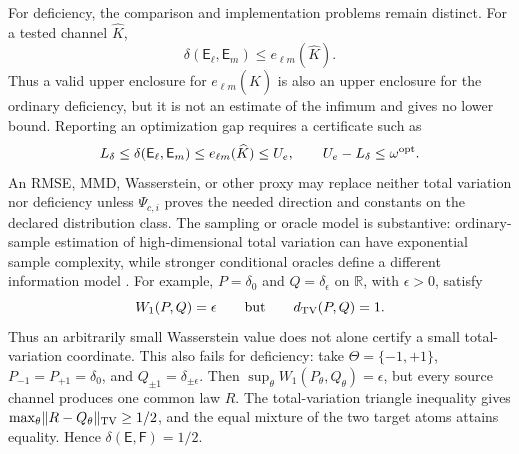 \documentclass[11pt,a4paper]{article}
\theoremstyle{definition}
\theoremstyle{plain}
\theoremstyle{remark}
\begin{document}
For deficiency, the comparison and implementation problems remain distinct.
For a tested channel \(\widehat K\),
\[
\delta(\mathsf E_\ell,\mathsf E_m)
\le e_{\ell m}(\widehat K).
\]
Thus a valid upper enclosure for \(e_{\ell m}(\widehat K)\) is also an upper
enclosure for the ordinary deficiency, but it is not an estimate of the
infimum and gives no lower bound.  Reporting an optimization gap requires a
certificate such as
\[
L_\delta\le\delta(\mathsf E_\ell,\mathsf E_m)
\le e_{\ell m}(\widehat K)\le U_e,
\qquad U_e-L_\delta\le\omega^{\rm opt}.
\]
An RMSE, MMD, Wasserstein, or other proxy may replace neither total variation
nor deficiency unless \(\Psi_{c,i}\) proves the needed direction and constants
on the declared distribution class.  The sampling or oracle model is
substantive: ordinary-sample estimation of high-dimensional total variation
can have exponential sample complexity, while stronger conditional oracles
define a different information model \citep{meel2025}.
For example, \(P=\delta_0\) and \(Q=\delta_\epsilon\) on
\(\mathbb R\), with \(\epsilon>0\), satisfy
\[
W_1(P,Q)=\epsilon
\qquad\text{but}\qquad
d_{\rm TV}(P,Q)=1.
\]
Thus an arbitrarily small Wasserstein value does not alone certify a small
total-variation coordinate.  This also fails for deficiency: take
\(\Theta=\{-1,+1\}\), \(P_{-1}=P_{+1}=\delta_0\), and
\(Q_{\pm1}=\delta_{\pm\epsilon}\).  Then
\(\sup_\theta W_1(P_\theta,Q_\theta)=\epsilon\), but every source channel
produces one common law \(R\).  The total-variation triangle inequality gives
\(\max_\theta\lVert R-Q_\theta\rVert_{\rm TV}\ge1/2\), and the equal mixture
of the two target atoms attains equality.  Hence
\(\delta(\mathsf E,\mathsf F)=1/2\).
\end{document}

